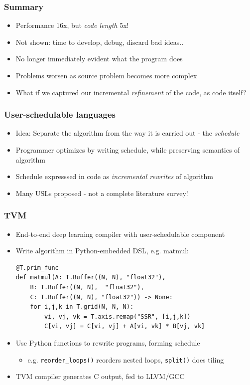 \documentclass[aspectratio=169]{beamer}
\begin{document}
\begin{frame}
    \frametitle{Summary}
    \begin{itemize}
    \item Performance \large{16x}, but \textit{code length} \large{5x}!
    \item Not shown: time to develop, debug, discard bad ideas..
    \item No longer immediately evident what the program does
    \item Problems worsen as source problem becomes more complex \pause
    \item What if we captured our incremental \textit{refinement} of the code, as code itself?
    \end{itemize}
\end{frame}
    
\begin{frame}
    \frametitle{User-schedulable languages}
    \begin{itemize}
    \item Idea: Separate the algorithm from the way it is carried out - the \textit{schedule} \pause
    \item Programmer optimizes by writing schedule, while preserving semantics of algorithm
    \item Schedule expresssed in code as \textit{incremental rewrites} of algorithm \pause
    \item Many USLs proposed - not a complete literature survey!
    \end{itemize}
\end{frame}

\begin{frame}[containsverbatim]
    \frametitle{TVM}
    \begin{itemize}
    \item End-to-end deep learning compiler with user-schedulable component
    \item Write algorithm in Python-embedded DSL, e.g. matmul:
    \begin{verbatim}
@T.prim_func
def matmul(A: T.Buffer((N, N), "float32"), 
    B: T.Buffer((N, N),  "float32"),
    C: T.Buffer((N, N), "float32")) -> None:
    for i,j,k in T.grid(N, N, N):
        vi, vj, vk = T.axis.remap("SSR", [i,j,k])
        C[vi, vj] = C[vi, vj] + A[vi, vk] * B[vj, vk]
    \end{verbatim}
    \item Use Python functions to rewrite programs, forming schedule
    \begin{itemize}
        \item e.g. \verb|reorder_loops()| reorders nested loops, \verb|split()| does tiling
    \end{itemize}
    \item TVM compiler generates C output, fed to LLVM/GCC
    \end{itemize}
\end{frame}
\end{document}
